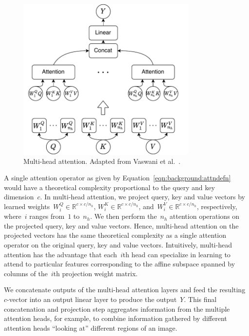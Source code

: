 \begin{figure}
\centering
\includegraphics[width=0.8\textwidth]{Figures/multihead-attention.pdf}
\caption{Multi-head attention.
         Adapted from Vaswani et al.~\cite{vaswani2017attention}.}
\label{fig:background:multiheadattn}
\end{figure}

A single attention operator as given by Equation~\ref{eqn:background:attndefn}
would have a theoretical complexity proportional to the query and key
dimension~$c$.
In multi-head attention, we project query, key and value vectors by learned
weights~$W^Q_i \in \mathbb{R}^{c\times c/n_h}$,
$W^K_i \in \mathbb{R}^{c\times c/n_h}$,
and~$W^V_i \in \mathbb{R}^{c\times c/n_h}$, respectively, where~$i$
ranges from~$1$ to~$n_h$.
We then perform the~$n_h$ attention operations on the projected query, key and
value vectors.
Hence, multi-head attention on the projected vectors has the same theoretical
complexity as a single attention operator on the original query, key and value
vectors.
Intuitively, multi-head attention has the advantage that each~$i$th head can
specialize in learning to attend to particular features corresponding to the
affine subspace spanned by columns of the~$i$th projection weight matrix.

We concatenate outputs of the multi-head attention layers and feed the
resulting~$c$-vector into an output linear layer to produce the output~$Y$.
This final concatenation and projection step aggregates information from the
multiple attention heads, for example, to combine information gathered by
different attention heads ``looking at'' different regions of an image.


